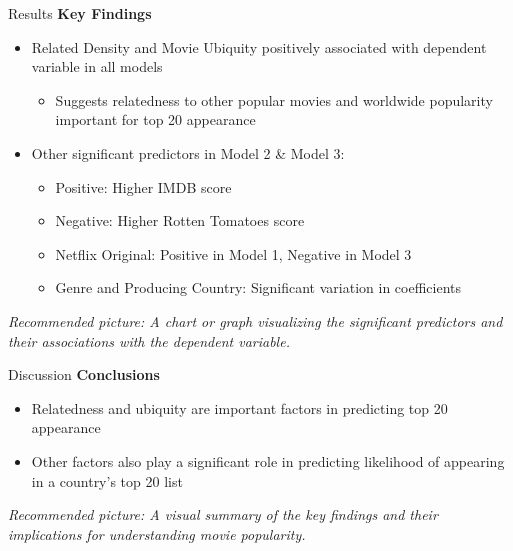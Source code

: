 \documentclass[
  ignorenonframetext,
]{beamer}
\providecommand{\tightlist}{%
  \setlength{\itemsep}{0pt}\setlength{\parskip}{0pt}}\usepackage{longtable,booktabs,array}
\begin{document}
\begin{frame}{Results}
\protect\hypertarget{results-1}{}
\textbf{Key Findings}

\begin{itemize}
\item
  Related Density and Movie Ubiquity positively associated with
  dependent variable in all models

  \begin{itemize}
  \tightlist
  \item
    Suggests relatedness to other popular movies and worldwide
    popularity important for top 20 appearance
  \end{itemize}
\item
  Other significant predictors in Model 2 \& Model 3:

  \begin{itemize}
  \item
    Positive: Higher IMDB score
  \item
    Negative: Higher Rotten Tomatoes score
  \item
    Netflix Original: Positive in Model 1, Negative in Model 3
  \item
    Genre and Producing Country: Significant variation in coefficients
  \end{itemize}
\end{itemize}

\emph{Recommended picture: A chart or graph visualizing the significant
predictors and their associations with the dependent variable.}
\end{frame}

\begin{frame}{Discussion}
\protect\hypertarget{discussion}{}
\textbf{Conclusions}

\begin{itemize}
\item
  Relatedness and ubiquity are important factors in predicting top 20
  appearance
\item
  Other factors also play a significant role in predicting likelihood of
  appearing in a country's top 20 list
\end{itemize}

\emph{Recommended picture: A visual summary of the key findings and
their implications for understanding movie popularity.}
\end{frame}
\end{document}
